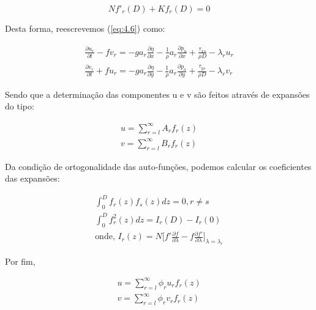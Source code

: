 \documentclass[11pt]{article}
\begin{document}
\begin{equation}
    N f'_r(D) + K f_r(D) = 0
    \label{eq:4.10}
\end{equation}

Desta forma, reescrevemos (\ref{eq:4.6}) como:

\begin{equation}
\begin{aligned}
    \frac{\partial{u_r}}{\partial{t}} - fv_r = -ga_r\frac{\partial{\eta}}{\partial{x}} - \frac{1}{\rho}a_r\frac{\partial{p_a}}{\partial{x}} + \frac{\tau_{xs}}{\rho D} - \lambda_ru_r
    \\
    \frac{\partial{v_r}}{\partial{t}} + fu_r = -ga_r\frac{\partial{\eta}}{\partial{y}} - \frac{1}{\rho}a_r\frac{\partial{p_a}}{\partial{y}} + \frac{\tau_{ys}}{\rho D} - \lambda_rv_r
    \label{eq:4.11}
    \end{aligned}
\end{equation}

Sendo que a determinação das componentes u e v são feitos através de
expansões do tipo:

\begin{equation}
\begin{aligned}
    u = \sum^{\infty}_{r=l} A_rf_r(z)
    \\
    v = \sum^{\infty}_{r=l} B_rf_r(z)
    \label{eq:4.12}
    \end{aligned}
\end{equation}

Da condição de ortogonalidade das auto-funções, podemos calcular os
coeficientes das expansões:

\begin{equation}
\begin{aligned}
    \int^{D}_{0}f_r(z) f_s(z) dz = 0, r \neq s
    \\
    \int^{D}_{0}f^{2}_{r}(z) dz = I_r(D) - I_r(0)
    \\
    \text{onde, } I_r(z) = N\bigg[ f'\frac{\partial{f}}{\partial{\lambda}} - f\frac{\partial{f'}}{\partial{\lambda}} \bigg]_{\lambda=\lambda_r}
    \label{eq:4.13}
    \end{aligned}
\end{equation}

Por fim,

\begin{equation}
\begin{aligned}
    u = \sum^{\infty}_{r=l} \phi_r u_r f_r(z)
    \\
    v = \sum^{\infty}_{r=l} \phi_r v_r f_r(z)
    \label{eq:4.14}
    \end{aligned}
\end{equation}
\end{document}
